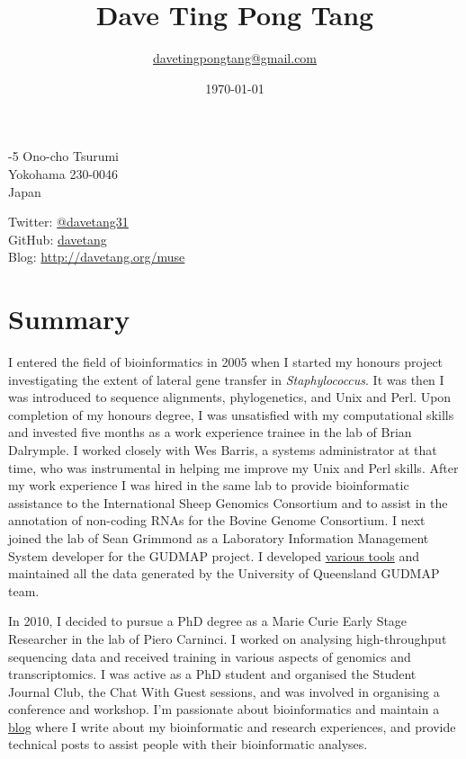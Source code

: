 \documentclass[a4paper, 10pt]{article}
\title{\bfseries\Huge Dave Ting Pong Tang}
\author{
   \href{mailto:davetingpongtang@gmail.com}{davetingpongtang@gmail.com}
}
\date{\mydate\today}
\begin{document}
\maketitle

\begin{minipage}[ht]{.40\textwidth}-5 Ono-cho Tsurumi \\
Yokohama 230-0046 \\
Japan
\end{minipage}
\begin{minipage}[ht]{.50\textwidth}\centering
Twitter: \href{https://twitter.com/davetang31}{@davetang31} \\
GitHub: \href{https://github.com/davetang}{davetang} \\
Blog: \href{http://davetang.org/muse}{http://davetang.org/muse}
\end{minipage}

\section*{Summary}

I entered the field of bioinformatics in 2005 when I started my honours project investigating the extent of lateral gene transfer in \textit{Staphylococcus}. It was then I was introduced to sequence alignments, phylogenetics, and Unix and Perl. Upon completion of my honours degree, I was unsatisfied with my computational skills and invested five months as a work experience trainee in the lab of Brian Dalrymple. I worked closely with Wes Barris, a systems administrator at that time, who was instrumental in helping me improve my Unix and Perl skills. After my work experience I was hired in the same lab to provide bioinformatic assistance to the International Sheep Genomics Consortium and to assist in the annotation of non-coding RNAs for the Bovine Genome Consortium. I next joined the lab of Sean Grimmond as a Laboratory Information Management System developer for the GUDMAP project. I developed \href{http://uqgudmap.imb.uq.edu.au/tools.html}{various tools} and maintained all the data generated by the University of Queensland GUDMAP team.

In 2010, I decided to pursue a PhD degree as a Marie Curie Early Stage Researcher in the lab of Piero Carninci. I worked on analysing high-throughput sequencing data and received training in various aspects of genomics and transcriptomics. I was active as a PhD student and organised the Student Journal Club, the Chat With Guest sessions, and was involved in organising a conference and workshop. I'm passionate about bioinformatics and maintain a \href{http://davetang.org/muse}{blog} where I write about my bioinformatic and research experiences, and provide technical posts to assist people with their bioinformatic analyses.
\end{document}
